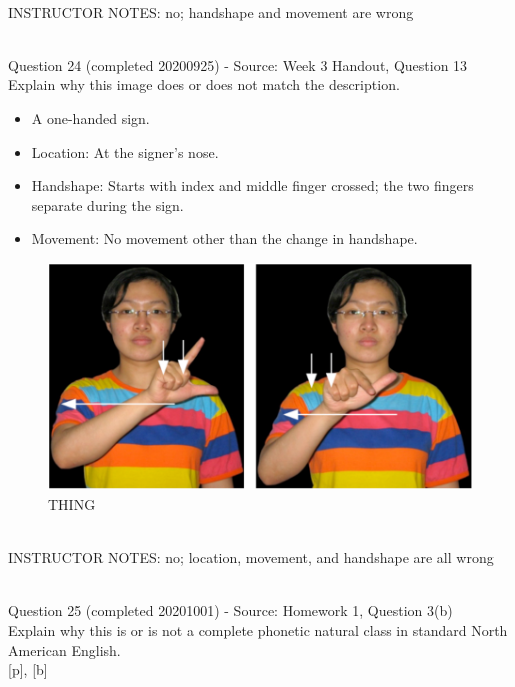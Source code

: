 \documentclass[12pt]{article}
\begin{document}
~\\
INSTRUCTOR NOTES: no; handshape and movement are wrong


~\\

{\large Question 24} (completed 20200925) - Source: Week 3 Handout, Question 13\\

Explain why this image does or does not match the description.\\

\begin{itemize} \item A one-handed sign. \item Location: At the signer’s nose. \item Handshape: Starts with index and middle finger crossed; the two fingers separate during the sign. \item Movement: No movement other than the change in handshape. \end{itemize}

\begin{figure}[H]
\includegraphics{../images/taiwansign_thing.png}
\caption{THING}
\end{figure}

~\\
INSTRUCTOR NOTES: no; location, movement, and handshape are all wrong


~\\

{\large Question 25} (completed 20201001) - Source: Homework 1, Question 3(b)\\

Explain why this is or is not a complete phonetic natural class in standard North American English.\\

{[p]}, {[b]}
\end{document}
